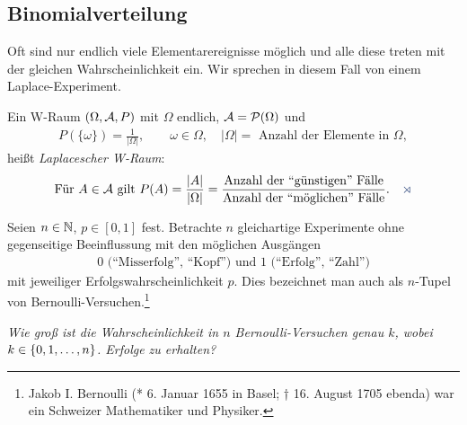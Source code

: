 \subsection{Binomialverteilung}

Oft sind nur endlich viele Elementarereignisse möglich und alle diese treten
mit der gleichen Wahrscheinlichkeit ein. Wir sprechen in diesem Fall von einem
Laplace-Experiment.
\begin{defnn}
Ein W-Raum $(\Omega, \AA,P)$ mit
$\Omega $ endlich, $\AA = {\cal P} (\Omega )$ und
\begin{align*}
P(\{\omega \}) = \frac{1}{|\Omega |},\qquad \omega \in \Omega,\quad
|\Omega | = \text{ Anzahl der Elemente in }\Omega,
\end{align*}
heißt \emph{Laplacescher W-Raum}:
\begin{align*}
\text{Für $A \in \AA$ gilt $P(A)= \frac{|A|}{|\Omega|}=
\frac{\mbox{Anzahl der ``günstigen'' Fälle}}
{\mbox{Anzahl der ``möglichen'' Fälle}}$}.\fishhere
\end{align*}
\end{defnn}

\begin{bsp}
\label{bsp:1.1:1}
Seien $n\in\N$, $p\in[0,1]$ fest. Betrachte $n$ gleichartige Experimente ohne
gegenseitige Beeinflussung mit den möglichen Ausgängen
\begin{align*}
\text{0 (``Misserfolg'', ``Kopf'') und 1
(``Erfolg'', ``Zahl'')}
\end{align*}
mit jeweiliger Erfolgswahrscheinlichkeit $p$.
Dies bezeichnet man auch als $n$-Tupel von
Bernoulli-Versuchen.\footnote{Jakob I. Bernoulli (* 6. Januar 1655 in Basel; †
16. August 1705 ebenda) war ein Schweizer Mathematiker und Physiker.}
\bsphere
\end{bsp}

\textit{Wie groß ist die Wahrscheinlichkeit in $n$ Bernoulli-Versuchen genau
$k$, wobei $k\in\setd{0,1,\ldots,n}$. Erfolge zu erhalten?}

